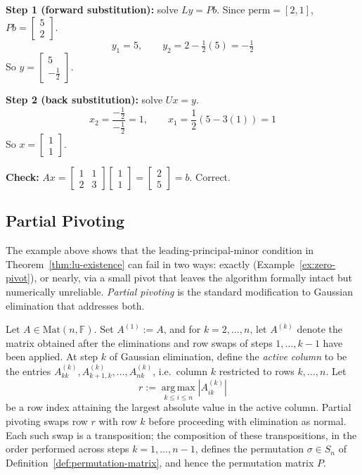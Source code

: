 \begin{example}[Solving $Ax=b$ via $PA=LU$]
			\textbf{Step 1 (forward substitution):} solve $Ly=Pb$. Since $\mathrm{perm}=[2,1]$, $Pb = 
			\begin{bmatrix} 5 \\ 2 \end{bmatrix}$.
			\[
				y_1 = 5, \qquad y_2 = 2 - \tfrac12(5) = -\tfrac12
			\]
			So $y = \begin{bmatrix}5\\-\tfrac12\end{bmatrix}$.
			
			\textbf{Step 2 (back substitution):} solve $Ux=y$.
			\[
				x_2 = \frac{-\tfrac12}{-\tfrac12} = 1, \qquad x_1 = \frac{1}{2}\left(5 - 3(1)\right) = 1
			\]
			So $x = \begin{bmatrix}1\\1\end{bmatrix}$.
			
			\textbf{Check:} $Ax = 
			\begin{bmatrix} 1 & 1 \\ 2 & 3 \end{bmatrix}
			\begin{bmatrix} 1 \\ 1 \end{bmatrix} = 
			\begin{bmatrix} 2 \\ 5 \end{bmatrix} = b$. Correct.
		\end{example}
		
	\subsection{Partial Pivoting}
		
		\indent \indent The example above shows that the leading-principal-minor condition in Theorem~\ref{thm:lu-existence} can fail in two ways: exactly (Example~\ref{ex:zero-pivot}), or nearly, via a small pivot that leaves the algorithm formally intact but numerically unreliable. \emph{Partial pivoting} is the standard modification to Gaussian elimination that addresses both.
		
		\begin{definition}
			\label{def:partial-pivoting}
			Let $A \in \mathrm{Mat}(n,\mathbb{F})$. Set $A^{(1)} := A$, and for $k = 2, \dots, n$, let $A^{(k)}$ denote the matrix obtained after the eliminations and row swaps of steps $1,\dots,k-1$ have been applied. At step $k$ of Gaussian elimination, define the \emph{active column} to be the entries $A^{(k)}_{kk}, A^{(k)}_{k+1,k}, \dots, A^{(k)}_{nk}$, i.e.\ column $k$ restricted to rows $k,\dots,n$. Let
			\[
				r := \operatorname*{arg\,max}_{k \le i \le n} 	|A^{(k)}_{ik}|
			\]
			be a row index attaining the largest absolute value in the active column. Partial pivoting swaps row $r$ with row $k$ before proceeding with elimination as normal. Each such swap is a transposition; the composition of these transpositions, in the order performed across steps $k=1,\dots,n-1$, defines the permutation $\sigma \in S_n$ of Definition~\ref{def:permutation-matrix}, and hence the permutation matrix $P$.
		\end{definition}
		
